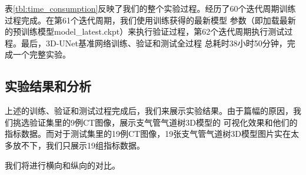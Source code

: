 表\ref{tbl:time_consumption}反映了我们的整个实验过程。经历了60个迭代周期训练过程完成。在第61个迭代周期，我们使用训练获得的最新模型
参数（即加载最新的预训练模型model\_latest.ckpt）来执行验证过程，第62个迭代周期执行测试过程。最后，3D-UNet基准网络训练、验证和测试全过程
总耗时38小时50分钟，完成一个完整实验。

\subsection{实验结果和分析}\label{subsec:experiment_results}
上述的训练、验证和测试过程完成后，我们来展示实验结果。由于篇幅的原因，我们挑选验证集里的9例CT图像，展示支气管气道树3D模型的
可视化效果和他们的指标数据。而对于测试集里的19例CT图像，19张支气管气道树3D模型图片实在太多放不下，我们只展示19组指标数据。

我们将进行横向和纵向的对比。
